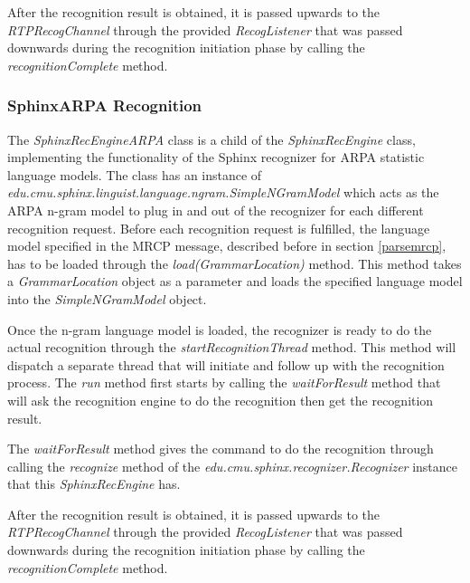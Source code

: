 After the recognition result is obtained, it is passed upwards to the \textit{RTPRecogChannel} through the provided \textit{RecogListener} that was passed downwards during the recognition initiation phase by calling the \textit{recognitionComplete} method.

\subsubsection{SphinxARPA Recognition}
The \textit{SphinxRecEngineARPA} class is a child of the \textit{SphinxRecEngine} class, implementing the functionality of the Sphinx recognizer for ARPA statistic language models.
The class has an instance of \textit{edu.cmu.sphinx.linguist.language.ngram.SimpleNGramModel} which acts as the ARPA n-gram model to plug in and out of the recognizer for each different recognition request.
Before each recognition request is fulfilled, the language model specified in the MRCP message, described before in section \ref{parsemrcp}, has to be loaded through the \textit{load(GrammarLocation)} method.
This method takes a \textit{GrammarLocation} object as a parameter and loads the specified language model into the \textit{SimpleNGramModel} object.


Once the n-gram language model is loaded, the recognizer is ready to do the actual recognition through the \textit{startRecognitionThread} method.
This method will dispatch a separate thread that will initiate and follow up with the recognition process.
The \textit{run} method first starts by calling the \textit{waitForResult} method that will ask the recognition engine to do the recognition then get the recognition result.


The \textit{waitForResult} method gives the command to do the recognition through calling the \textit{recognize} method of the \textit{edu.cmu.sphinx.recognizer.Recognizer} instance that this \textit{SphinxRecEngine} has.


After the recognition result is obtained, it is passed upwards to the \textit{RTPRecogChannel} through the provided \textit{RecogListener} that was passed downwards during the recognition initiation phase by calling the \textit{recognitionComplete} method.
